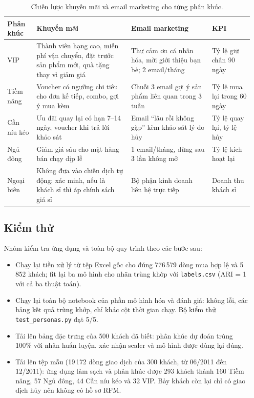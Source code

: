 \documentclass[../report.tex]{subfiles}
\begin{document}
\begin{table}[H]
\centering
\small
\begin{tabularx}{\textwidth}{@{}l X X l@{}}
\toprule
\textbf{Phân khúc} & \textbf{Khuyến mãi} & \textbf{Email marketing} & \textbf{KPI} \\
\midrule
VIP & Thành viên hạng cao, miễn phí vận chuyển, đặt trước sản phẩm mới, quà tặng thay vì giảm giá & Thư cảm ơn cá nhân hóa, mời giới thiệu bạn bè; 2 email/tháng & Tỷ lệ giữ chân 90 ngày \\
Tiềm năng & Voucher có ngưỡng chi tiêu cho đơn kế tiếp, combo, gợi ý mua kèm & Chuỗi 3 email gợi ý sản phẩm liên quan trong 3 tuần & Tỷ lệ mua lại trong 60 ngày \\
Cần níu kéo & Ưu đãi quay lại có hạn 7--14 ngày, voucher khi trả lời khảo sát & Email ``lâu rồi không gặp'' kèm khảo sát lý do hủy & Tỷ lệ quay lại, tỷ lệ hủy \\
Ngủ đông & Giảm giá sâu cho mặt hàng bán chạy dịp lễ & 1 email/tháng, dừng sau 3 lần không mở & Tỷ lệ kích hoạt lại \\
Ngoại biên & Không đưa vào chiến dịch tự động; xác minh, nếu là khách sỉ thì áp chính sách giá sỉ & Bộ phận kinh doanh liên hệ trực tiếp & Doanh thu khách sỉ \\
\bottomrule
\end{tabularx}
\caption{Chiến lược khuyến mãi và email marketing cho từng phân khúc.}
\label{tab:strategy}
\end{table}

\subsection{Kiểm thử}

Nhóm kiểm tra ứng dụng và toàn bộ quy trình theo các bước sau:
\begin{itemize}[leftmargin=1.5em]
\item Chạy lại tiền xử lý từ tệp Excel gốc cho đúng 776\,579 dòng mua hợp lệ và 5\,852 khách; fit lại ba mô hình cho nhãn trùng khớp với \texttt{labels.csv} (ARI = 1 với cả ba thuật toán).
\item Chạy lại toàn bộ notebook của phần mô hình hóa và đánh giá: không lỗi, các bảng kết quả trùng khớp, chỉ khác cột thời gian chạy. Bộ kiểm thử \texttt{test\_personas.py} đạt 5/5.
\item Tải lên bảng đặc trưng của 500 khách đã biết: phân khúc dự đoán trùng 100\% với nhãn huấn luyện, xác nhận scaler và mô hình được dùng lại đúng.
\item Tải lên tệp mẫu  (19\,172 dòng giao dịch của 300 khách, từ 06/2011 đến 12/2011): ứng dụng làm sạch và phân khúc được 293 khách thành 160 Tiềm năng, 57 Ngủ đông, 44 Cần níu kéo và 32 VIP. Bảy khách còn lại chỉ có giao dịch hủy nên không có hồ sơ RFM.
\end{itemize}
\end{document}

